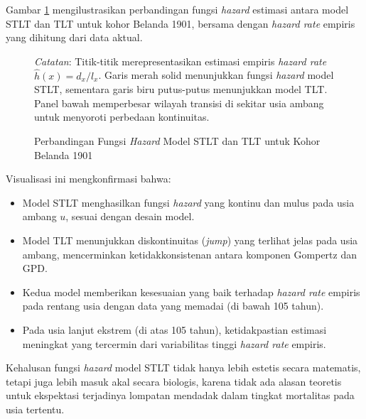 Gambar \ref{fig:stlt_hazard_comparison} mengilustrasikan perbandingan fungsi \textit{hazard} estimasi antara model STLT dan TLT untuk kohor Belanda 1901, bersama dengan \textit{hazard rate} empiris yang dihitung dari data aktual.

\begin{figure}[htbp]
\centering
\caption{Perbandingan Fungsi \textit{Hazard} Model STLT dan TLT untuk Kohor Belanda 1901}
\label{fig:stlt_hazard_comparison}
\begin{fignotes}
\small
\item \textit{Catatan}: Titik-titik merepresentasikan estimasi empiris \textit{hazard rate} $\hat{h}(x) = d_x/l_x$. Garis merah solid menunjukkan fungsi \textit{hazard} model STLT, sementara garis biru putus-putus menunjukkan model TLT. Panel bawah memperbesar wilayah transisi di sekitar usia ambang untuk menyoroti perbedaan kontinuitas.
\end{fignotes}
\end{figure}

Visualisasi ini mengkonfirmasi bahwa:
\begin{itemize}
    \item Model STLT menghasilkan fungsi \textit{hazard} yang kontinu dan mulus pada usia ambang $u$, sesuai dengan desain model.
    \item Model TLT menunjukkan diskontinuitas (\textit{jump}) yang terlihat jelas pada usia ambang, mencerminkan ketidakkonsistenan antara komponen Gompertz dan GPD.
    \item Kedua model memberikan kesesuaian yang baik terhadap \textit{hazard rate} empiris pada rentang usia dengan data yang memadai (di bawah 105 tahun).
    \item Pada usia lanjut ekstrem (di atas 105 tahun), ketidakpastian estimasi meningkat yang tercermin dari variabilitas tinggi \textit{hazard rate} empiris.
\end{itemize}

Kehalusan fungsi \textit{hazard} model STLT tidak hanya lebih estetis secara matematis, tetapi juga lebih masuk akal secara biologis, karena tidak ada alasan teoretis untuk ekspektasi terjadinya lompatan mendadak dalam tingkat mortalitas pada usia tertentu.

